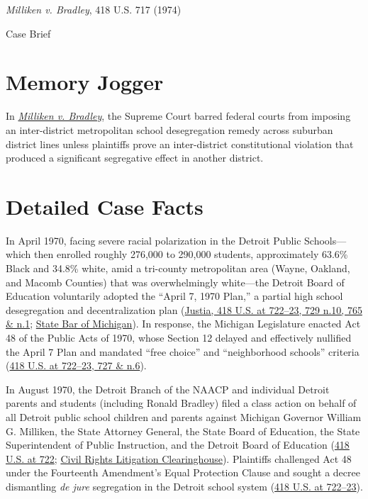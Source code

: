 \documentclass[12pt]{article}
\begin{document}
\begin{center}
{\LARGE \textit{Milliken v. Bradley}, 418 U.S. 717 (1974)\par}
\vspace{0.8em}
{\large Case Brief\par}
\end{center}
\vspace{1em}

\section{Memory Jogger}
In \href{https://www.courtlistener.com/opinion/109102/milliken-v-bradley/}{\textit{Milliken v. Bradley}}, the Supreme Court barred federal courts from imposing an inter-district metropolitan school desegregation remedy across suburban district lines unless plaintiffs prove an inter-district constitutional violation that produced a significant segregative effect in another district.

\section{Detailed Case Facts}
In April 1970, facing severe racial polarization in the Detroit Public Schools---which then enrolled roughly 276,000 to 290,000 students, approximately 63.6\% Black and 34.8\% white, amid a tri-county metropolitan area (Wayne, Oakland, and Macomb Counties) that was overwhelmingly white---the Detroit Board of Education voluntarily adopted the ``April 7, 1970 Plan,'' a partial high school desegregation and decentralization plan (\href{https://supreme.justia.com/cases/federal/us/418/717/}{Justia, 418 U.S. at 722--23, 729 n.10, 765 \& n.1}; \href{https://www.michbar.org/file/journal/pdf/pdf4article1911.pdf}{State Bar of Michigan}). In response, the Michigan Legislature enacted Act 48 of the Public Acts of 1970, whose Section 12 delayed and effectively nullified the April 7 Plan and mandated ``free choice'' and ``neighborhood schools'' criteria (\href{https://supreme.justia.com/cases/federal/us/418/717/}{418 U.S. at 722--23, 727 \& n.6}).

In August 1970, the Detroit Branch of the NAACP and individual Detroit parents and students (including Ronald Bradley) filed a class action on behalf of all Detroit public school children and parents against Michigan Governor William G. Milliken, the State Attorney General, the State Board of Education, the State Superintendent of Public Instruction, and the Detroit Board of Education (\href{https://supreme.justia.com/cases/federal/us/418/717/}{418 U.S. at 722}; \href{https://clearinghouse.net/case/11076/}{Civil Rights Litigation Clearinghouse}). Plaintiffs challenged Act 48 under the Fourteenth Amendment's Equal Protection Clause and sought a decree dismantling \textit{de jure} segregation in the Detroit school system (\href{https://supreme.justia.com/cases/federal/us/418/717/}{418 U.S. at 722--23}).
\end{document}
